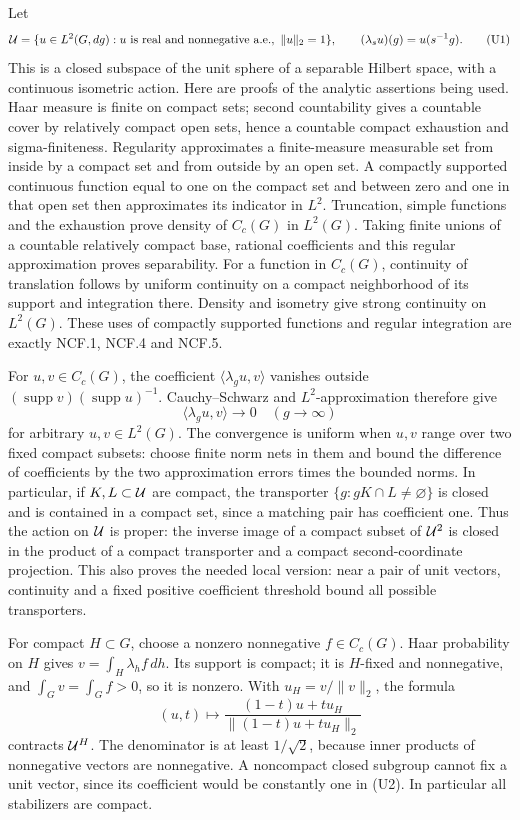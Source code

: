 \documentclass[
  11pt,
]{article}
\begin{document}
Let \[
 {\cal U}=\{u\in L^2(G,dg):u\text{ is real and nonnegative a.e.},\
                  \|u\|_2=1\},\qquad
 (\lambda_su)(g)=u(s^{-1}g).
 \tag{U1}
\] This is a closed subspace of the unit sphere of a separable Hilbert
space, with a continuous isometric action. Here are proofs of the
analytic assertions being used. Haar measure is finite on compact sets;
second countability gives a countable cover by relatively compact open
sets, hence a countable compact exhaustion and sigma-finiteness.
Regularity approximates a finite-measure measurable set from inside by a
compact set and from outside by an open set. A compactly supported
continuous function equal to one on the compact set and between zero and
one in that open set then approximates its indicator in \(L^2\).
Truncation, simple functions and the exhaustion prove density of
\(C_c(G)\) in \(L^2(G)\). Taking finite unions of a countable relatively
compact base, rational coefficients and this regular approximation
proves separability. For a function in \(C_c(G)\), continuity of
translation follows by uniform continuity on a compact neighborhood of
its support and integration there. Density and isometry give strong
continuity on \(L^2(G)\). These uses of compactly supported functions
and regular integration are exactly NCF.1, NCF.4 and NCF.5.

For \(u,v\in C_c(G)\), the coefficient \(\langle\lambda_gu,v\rangle\)
vanishes outside \((\operatorname{supp}v)(\operatorname{supp}u)^{-1}\).
Cauchy--Schwarz and \(L^2\)-approximation therefore give \[
 \langle\lambda_gu,v\rangle\longrightarrow0\quad(g\longrightarrow\infty)
 \tag{U2}
\] for arbitrary \(u,v\in L^2(G)\). The convergence is uniform when
\(u,v\) range over two fixed compact subsets: choose finite norm nets in
them and bound the difference of coefficients by the two approximation
errors times the bounded norms. In particular, if \(K,L\subset{\cal U}\)
are compact, the transporter \(\{g:gK\cap L\ne\varnothing\}\) is closed
and is contained in a compact set, since a matching pair has coefficient
one. Thus the action on \({\cal U}\) is proper: the inverse image of a
compact subset of \({\cal U}^2\) is closed in the product of a compact
transporter and a compact second-coordinate projection. This also proves
the needed local version: near a pair of unit vectors, continuity and a
fixed positive coefficient threshold bound all possible transporters.

For compact \(H\subset G\), choose a nonzero nonnegative
\(f\in C_c(G)\). Haar probability on \(H\) gives
\(v=\int_H\lambda_h f\,dh\). Its support is compact; it is \(H\)-fixed
and nonnegative, and \(\int_Gv=\int_Gf>0\), so it is nonzero. With
\(u_H=v/\|v\|_2\), the formula \[
 (u,t)\longmapsto
 \frac{(1-t)u+t u_H}{\|(1-t)u+t u_H\|_2}
 \tag{U3}
\] contracts \({\cal U}^H\). The denominator is at least \(1/\sqrt2\),
because inner products of nonnegative vectors are nonnegative. A
noncompact closed subgroup cannot fix a unit vector, since its
coefficient would be constantly one in (U2). In particular all
stabilizers are compact.
\end{document}
